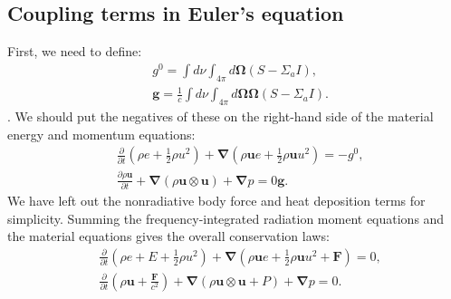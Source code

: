 \documentclass[letterpaper]{report}
\newcommand\bn{\boldsymbol{\nabla}}
\newcommand\bo{\boldsymbol{\Omega}}
\newcommand\bs{\boldsymbol}
\renewcommand{\(}{\left(}
\renewcommand{\)}{\right)}
\renewcommand{\[}{\left[}
\renewcommand{\]}{\right]}
\begin{document}
\subsection{Coupling terms in Euler's equation}
First, we need to define:
\begin{align}
  &g^0 = \int d\nu\int_{4\pi} d\bo (S-\Sigma_a I),\\
  &\bs{g} = \frac{1}{c}\int d\nu \int_{4\pi} d\bo \bo(S-\Sigma_a I).
\end{align}.
We should put the negatives of these on the right-hand side of the material
energy and momentum equations:
\begin{align}
  &\frac{\partial}{\partial t}\(\rho e + \frac{1}{2}\rho u^2\) + \bn \(\rho
  \bs{u} e + \frac{1}{2} \rho \bs{u}u^2\) = - g^0,\\
  & \frac{\partial \rho \bs{u}}{\partial t} + \bn(\rho\bs{u}\otimes\bs{u})+
  \bn p = 0\bs{g}.
\end{align}
We have left out the nonradiative body force and heat deposition terms for
simplicity. Summing the frequency-integrated radiation moment equations and
the material equations gives the overall conservation laws:
\begin{align}
  &\frac{\partial}{\partial t}\(\rho e + E + \frac{1}{2}\rho u^2\) + \bn \(\rho
  \bs{u} e + \frac{1}{2} \rho \bs{u}u^2 + \bs{F}\) = 0,\\
  & \frac{\partial}{\partial t}\(\rho \bs{u} + \frac{\bs{F}}{c^2}\) +
  \bn(\rho\bs{u}\otimes\bs{u}+ P) + \bn p = 0.
\end{align}
\end{document}
